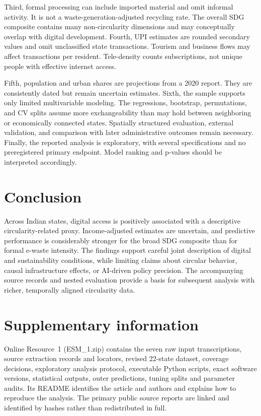 \documentclass[11pt,a4paper]{article}
\begin{document}
Third, formal processing can include imported material and omit informal activity. It is not a waste-generation-adjusted recycling rate. The overall SDG composite contains many non-circularity dimensions and may conceptually overlap with digital development. Fourth, UPI estimates are rounded secondary values and omit unclassified state transactions. Tourism and business flows may affect transactions per resident. Tele-density counts subscriptions, not unique people with effective internet access.

Fifth, population and urban shares are projections from a 2020 report. They are consistently dated but remain uncertain estimates. Sixth, the sample supports only limited multivariable modeling. The regressions, bootstrap, permutations, and CV splits assume more exchangeability than may hold between neighboring or economically connected states. Spatially structured evaluation, external validation, and comparison with later administrative outcomes remain necessary. Finally, the reported analysis is exploratory, with several specifications and no preregistered primary endpoint. Model ranking and p-values should be interpreted accordingly.

\section{Conclusion}
Across \SampleN{} Indian states, digital access is positively associated with a descriptive circularity-related proxy. Income-adjusted estimates are uncertain, and predictive performance is considerably stronger for the broad SDG composite than for formal e-waste intensity. The findings support careful joint description of digital and sustainability conditions, while limiting claims about circular behavior, causal infrastructure effects, or AI-driven policy precision. The accompanying source records and nested evaluation provide a basis for subsequent analysis with richer, temporally aligned circularity data.

\section*{Supplementary information}
Online Resource~1 (ESM\_1.zip) contains the seven raw input transcriptions, source extraction records and locators, revised 22-state dataset, coverage decisions, exploratory analysis protocol, executable Python scripts, exact software versions, statistical outputs, outer predictions, tuning splits and parameter audits. Its README identifies the article and authors and explains how to reproduce the analysis. The primary public source reports are linked and identified by hashes rather than redistributed in full.
\end{document}
